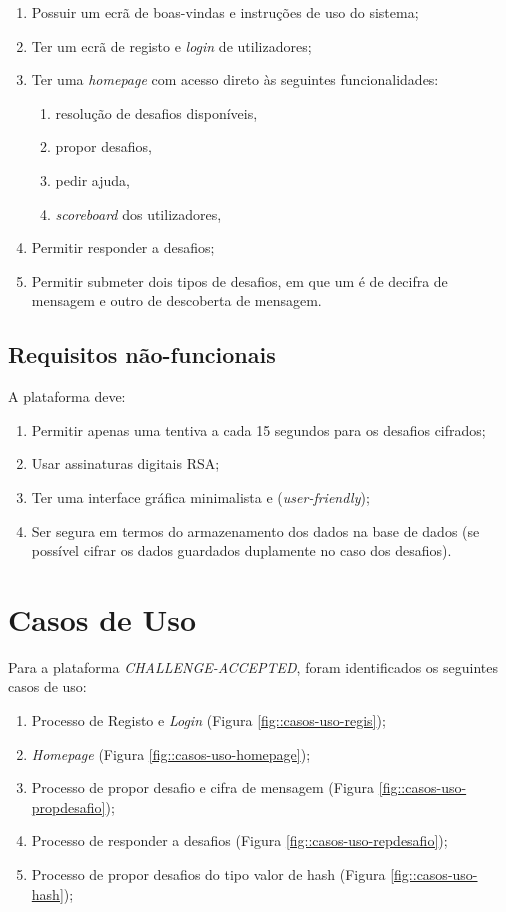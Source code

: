 \begin{enumerate}
    \item Possuir um ecrã de boas-vindas e instruções de uso do sistema;
    \item Ter um ecrã de registo e \emph{login} de utilizadores;
    \item Ter uma \textit{homepage} com acesso direto às seguintes funcionalidades:
    \begin{enumerate}
        \item resolução de desafios disponíveis,
        \item propor desafios,
        \item pedir ajuda,
        \item \textit{scoreboard} dos utilizadores,
    \end{enumerate}
    \item Permitir responder a desafios;
    \item Permitir submeter dois tipos de desafios, em que um é de decifra de mensagem e outro de descoberta de mensagem.
\end{enumerate}


\subsection{Requisitos não-funcionais}
\label{ssec::engsoft:requisitos:nao-funcionais}

A plataforma deve:

\begin{enumerate}
    \item Permitir apenas uma tentiva a cada 15 segundos para os desafios cifrados;
    \item Usar assinaturas digitais \ac{RSA};
    \item Ter uma interface gráfica minimalista e (\textit{user-friendly});
    \item Ser segura em termos do armazenamento dos dados na base de dados (se possível cifrar os dados guardados duplamente no caso dos desafios).
\end{enumerate}


\section{Casos de Uso}
\label{sec::engsoft:casos-uso}

Para a plataforma \emph{CHALLENGE-ACCEPTED}, foram identificados os seguintes casos de uso:
\begin{enumerate}
    \item Processo de Registo e \emph{Login} (Figura \ref{fig::casos-uso-regis});
    \item \textit{Homepage} (Figura \ref{fig::casos-uso-homepage});
    \item Processo de propor desafio e cifra de mensagem (Figura \ref{fig::casos-uso-propdesafio});
    \item Processo de responder a desafios (Figura \ref{fig::casos-uso-repdesafio});
    \item Processo de propor desafios do tipo valor de hash (Figura \ref{fig::casos-uso-hash});
\end{enumerate}

